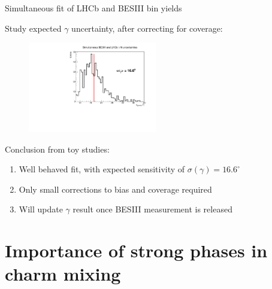 \documentclass[xcolor={dvipsnames}]{beamer}
\begin{document}
\begin{frame}{Simultaneous fit of LHCb and BESIII bin yields}
  \begin{center}
    \large Study expected $\gamma$ uncertainty, after correcting for coverage:
  \end{center}
  \vspace{-0.3cm}
  \begin{figure}[htb]
    \centering
    \includegraphics[width=0.5\textwidth]{Plots/Gamma_SimultaneousFit_err.pdf}
  \end{figure}
  \vspace{-0.4cm}
  {\large Conclusion from toy studies:}
  \vspace{-0.0cm}
  \begin{enumerate}
    \item{Well behaved fit, with expected sensitivity of $\sigma(\gamma) = 16.6^\circ$}
    \item{Only small corrections to bias and coverage required}
    \item{Will update $\gamma$ result once BESIII measurement is released}
  \end{enumerate}
\end{frame}

\section{Importance of strong phases in charm mixing}
\end{document}

